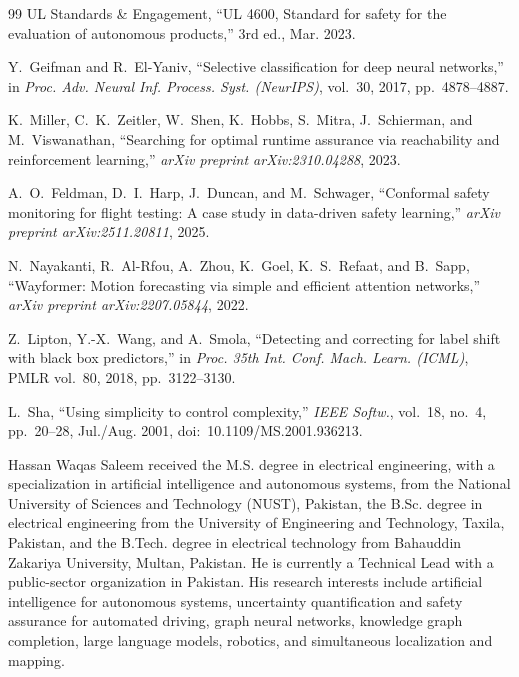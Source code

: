 \documentclass[lettersize,journal]{IEEEtran}
\begin{document}
\begin{thebibliography}{99}
UL Standards \& Engagement, ``UL 4600, Standard for safety for the
evaluation of autonomous products,'' 3rd ed., Mar. 2023.

Y.~Geifman and R.~El-Yaniv, ``Selective classification for deep neural
networks,'' in \emph{Proc. Adv. Neural Inf. Process. Syst. (NeurIPS)}, vol.~30,
2017, pp.~4878--4887.

K.~Miller, C.~K.~Zeitler, W.~Shen, K.~Hobbs, S.~Mitra, J.~Schierman, and
M.~Viswanathan, ``Searching for optimal runtime assurance via reachability
and reinforcement learning,'' \emph{arXiv preprint arXiv:2310.04288}, 2023.

A.~O.~Feldman, D.~I.~Harp, J.~Duncan, and M.~Schwager, ``Conformal safety
monitoring for flight testing: A case study in data-driven safety
learning,'' \emph{arXiv preprint arXiv:2511.20811}, 2025.

N.~Nayakanti, R.~Al-Rfou, A.~Zhou, K.~Goel, K.~S.~Refaat, and B.~Sapp, ``Wayformer: Motion forecasting via simple and efficient attention networks,'' \emph{arXiv preprint arXiv:2207.05844}, 2022.

Z.~Lipton, Y.-X.~Wang, and A.~Smola, ``Detecting and correcting for label shift with black box predictors,'' in \emph{Proc. 35th Int. Conf. Mach. Learn. (ICML)}, PMLR vol.~80, 2018, pp.~3122--3130.

L.~Sha, ``Using simplicity to control complexity,'' \emph{IEEE Softw.}, vol.~18, no.~4, pp.~20--28, Jul./Aug. 2001, doi:~10.1109/MS.2001.936213.

\end{thebibliography}

\begin{IEEEbiographynophoto}{Hassan Waqas Saleem}
received the M.S. degree in electrical engineering,
with a specialization in artificial intelligence and autonomous systems, from
the National University of Sciences and Technology (NUST), Pakistan, the
B.Sc. degree in electrical engineering from the University of Engineering and
Technology, Taxila, Pakistan, and the B.Tech. degree in electrical technology
from Bahauddin Zakariya University, Multan, Pakistan. He is currently a
Technical Lead with a public-sector organization in Pakistan. His research
interests include artificial intelligence for autonomous systems, uncertainty
quantification and safety assurance for automated driving, graph neural
networks, knowledge graph completion, large language models, robotics, and
simultaneous localization and mapping.
\end{IEEEbiographynophoto}
\end{document}
